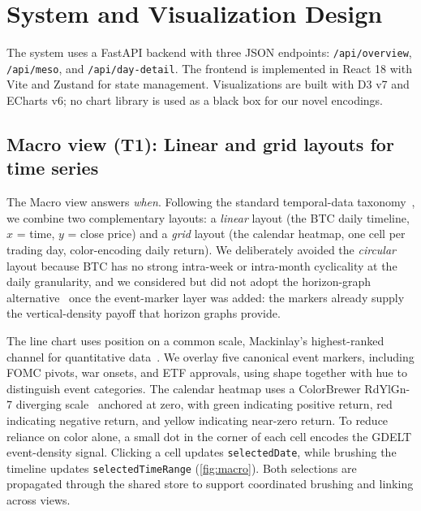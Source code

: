 \documentclass[journal,hideappendix]{vgtc}      %
\begin{document}
\section{System and Visualization Design}
\label{sec:system}

The system uses a FastAPI backend with three JSON endpoints:
\texttt{/api/overview}, \texttt{/api/meso}, and \texttt{/api/day-detail}.
The frontend is implemented in React 18 with Vite and Zustand for state management.
Visualizations are built with D3 v7 and ECharts v6; no chart library is used as a black box for our novel encodings.

\subsection{Macro view (T1): Linear and grid layouts for time series}

The Macro view answers \emph{when}.  Following the standard
temporal-data taxonomy~\cite{munzner2014}, we combine two
complementary layouts: a \emph{linear} layout (the BTC daily timeline,
$x$ = time, $y$ = close price) and a \emph{grid} layout (the calendar
heatmap, one cell per trading day, color-encoding daily return).  We
deliberately avoided the \emph{circular} layout because BTC has no
strong intra-week or intra-month cyclicality at the daily granularity,
and we considered but did not adopt the horizon-graph
alternative~\cite{heer2009} once the event-marker layer was added: the
markers already supply the vertical-density payoff that horizon
graphs provide.

The line chart uses position on a common scale, Mackinlay's highest-ranked channel for quantitative data~\cite{mackinlay1986}. We overlay five canonical event markers, including FOMC pivots, war onsets, and ETF approvals, using shape together with hue to distinguish event categories. 
The calendar heatmap uses a ColorBrewer RdYlGn-7 diverging scale~\cite{colorbrewer} anchored at zero, with green indicating positive return, red indicating negative return, and yellow indicating near-zero return. To reduce reliance on color alone, a small dot in the corner of each cell encodes the GDELT event-density signal. Clicking a cell updates \texttt{selectedDate}, while brushing the timeline updates \texttt{selectedTimeRange} (\cref{fig:macro}). Both selections are propagated through the shared store to support coordinated brushing and linking across views.


\end{document}

